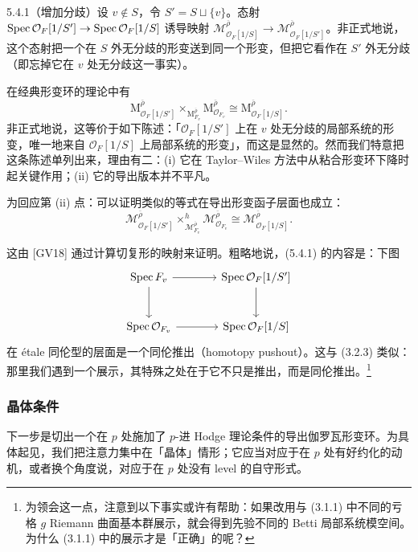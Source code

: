 \begin{exam}{5.4.1}\label{thm:a6-03-10}（增加分歧）设 $v\notin S$，令 $S'=S\sqcup\{v\}$。态射 $\operatorname{Spec}\mathcal O_F[1/S']\to\operatorname{Spec}\mathcal O_F[1/S]$ 诱导映射 $\mathcal M^{\overline\rho}_{\mathcal O_F[1/S]}\to\mathcal M^{\overline\rho}_{\mathcal O_F[1/S']}$。非正式地说，这个态射把一个在 $S$ 外无分歧的形变送到同一个形变，但把它看作在 $S'$ 外无分歧（即忘掉它在 $v$ 处无分歧这一事实）。

在经典形变环的理论中有
\[
\mathrm M^{\overline\rho}_{\mathcal O_F[1/S']}\times_{\mathrm M^{\overline\rho}_{F_v}}\mathrm M^{\overline\rho}_{\mathcal O_{F_v}}\cong\mathrm M^{\overline\rho}_{\mathcal O_F[1/S]}.
\]
非正式地说，这等价于如下陈述：「$\mathcal O_F[1/S']$ 上在 $v$ 处无分歧的局部系统的形变，唯一地来自 $\mathcal O_F[1/S]$ 上局部系统的形变」，而这是显然的。然而我们特意把这条陈述单列出来，理由有二：(i) 它在 Taylor--Wiles 方法中从粘合形变环下降时起关键作用；(ii) 它的导出版本并不平凡。

为回应第 (ii) 点：可以证明类似的等式在导出形变函子层面也成立：
\begin{equation}\tag{5.4.1}\label{eq:a6-03-6}
\mathcal M^{\overline\rho}_{\mathcal O_F[1/S']}\times^{h}_{\mathcal M^{\overline\rho}_{F_v}}\mathcal M^{\overline\rho}_{\mathcal O_{F_v}}\cong\mathcal M^{\overline\rho}_{\mathcal O_F[1/S]}.
\end{equation}

这由 [GV18] 通过计算切复形的映射来证明。粗略地说，(5.4.1) 的内容是：下图
\[
\begin{tikzcd}[column sep=large, row sep=large]
\Spec F_v\arrow[r]\arrow[d] & \Spec\mathcal O_F[1/S']\arrow[d]\\
\Spec\mathcal O_{F_v}\arrow[r] & \Spec\mathcal O_F[1/S]
\end{tikzcd}
\]
在 \'etale 同伦型的层面是一个同伦推出（homotopy pushout）。这与 (3.2.3) 类似：那里我们遇到一个展示，其特殊之处在于它不只是推出，而是同伦推出。\footnote{为领会这一点，注意到以下事实或许有帮助：如果改用与 (3.1.1) 中不同的亏格 $g$ Riemann 曲面基本群展示，就会得到先验不同的 Betti 局部系统模空间。为什么 (3.1.1) 中的展示才是「正确」的呢？}

\end{exam}

\subsubsection{晶体条件}

下一步是切出一个在 $p$ 处施加了 $p$-进 Hodge 理论条件的导出伽罗瓦形变环。为具体起见，我们把注意力集中在「晶体」情形；它应当对应于在 $p$ 处有好约化的动机，或者换个角度说，对应于在 $p$ 处没有 level 的自守形式。

